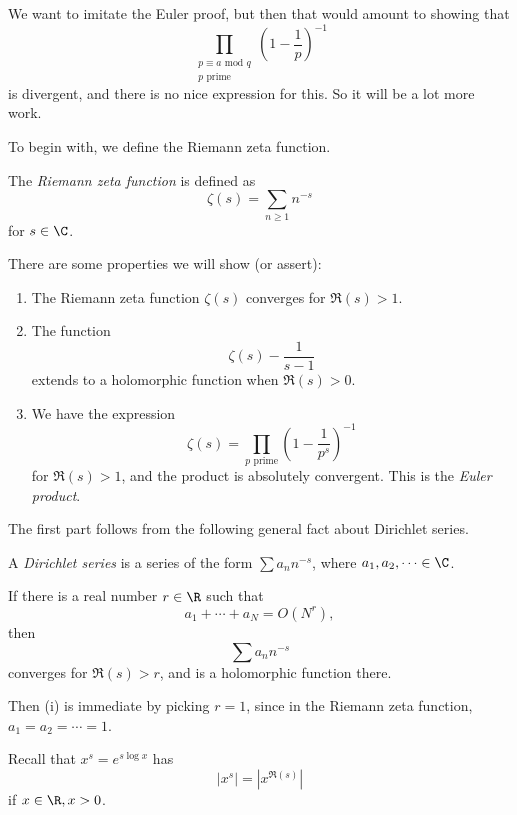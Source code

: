 \documentclass[a4paper]{article}
\begin{document}
We want to imitate the Euler proof, but then that would amount to showing that
\[
  \prod_{\substack{p \equiv a \text{ mod } q\\ p\text{ prime}}} \left(1 - \frac{1}{p}\right)^{-1}
\]
is divergent, and there is no nice expression for this. So it will be a lot more work.

To begin with, we define the Riemann zeta function.
\begin{defi}
  The \emph{Riemann zeta function} is defined as
  \[
    \zeta(s) = \sum_{n \geq 1}n^{-s}
  \]
  for $s \in \C$.
\end{defi}

There are some properties we will show (or assert):
\begin{prop}\leavevmode
  \begin{enumerate}
    \item The Riemann zeta function $\zeta(s)$ converges for $\Re(s) > 1$.
    \item The function
      \[
        \zeta(s) - \frac{1}{s - 1}
      \]
      extends to a holomorphic function when $\Re(s) > 0$.
    \item We have the expression
      \[
        \zeta(s) = \prod_{p\text{ prime}} \left(1 - \frac{1}{p^s}\right)^{-1}
      \]
      for $\Re(s) > 1$, and the product is absolutely convergent. This is the \emph{Euler product}.
  \end{enumerate}
\end{prop}

The first part follows from the following general fact about Dirichlet series.
\begin{defi}
  A \emph{Dirichlet series} is a series of the form $\sum a_n n^{-s}$, where $a_1, a_2, \cdots\in \C$.
\end{defi}

\begin{lemma}
  If there is a real number $r \in \R$ such that
  \[
    a_1 + \cdots + a_N = O(N^r),
  \]
  then
  \[
    \sum a_n n^{-s}
  \]
  converges for $\Re(s) > r$, and is a holomorphic function there.
\end{lemma}
Then (i) is immediate by picking $r = 1$, since in the Riemann zeta function, $a_1 = a_2 = \cdots = 1$.

Recall that $x^s = e^{s \log x}$ has
\[
  |x^s| = |x^{\Re(s)}|
\]
if $x \in \R, x > 0$.
\end{document}
